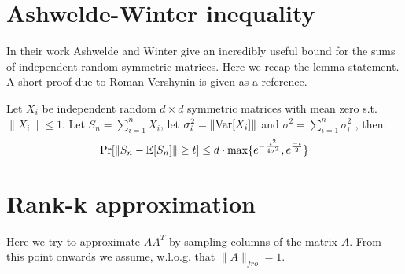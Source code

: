 \documentclass{article}
\begin{document}


\section{Ashwelde-Winter inequality}
In their work \cite{AhlswedeW02} Ashwelde and Winter give an incredibly useful bound for 
the sums of independent random symmetric matrices.
Here we recap the lemma statement. 
A short proof due to Roman Vershynin \cite{VershyninMatrixChernoffBounds} is given as a reference.
 
\begin{lemma}
Let $X_i$ be independent random $d \times d$ symmetric matrices with mean zero s.t. $\|X_i\| \le 1$.
Let $S_n = \sum_{i=1}^{n}X_i$, let $\sigma^2_i = \|{\operatorname{Var}}[X_i]\|$ and $\sigma^2 = \sum_{i=1}^{n}\sigma^2_i$ , then:
\[
\Pr[\| S_n - {\mathbb E}[S_n] \| \ge t] \le d\cdot \max\{e^{-\frac{t^2}{4\sigma^2}}, e^{\frac{-t}{2}}\}
\] 
\end{lemma}

\section{Rank-k approximation}

Here we try to approximate $AA^T$ by sampling columns of the matrix $A$.
From this point onwards we assume, w.l.o.g. that $\|A\|_{fro} = 1$.
\end{document}
